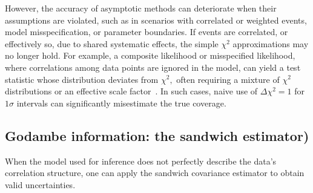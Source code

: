         However, the accuracy of asymptotic methods can deteriorate when their assumptions are violated, such as in scenarios with correlated or weighted events, model misspecification, or parameter boundaries.
        If events are correlated, or effectively so, due to shared systematic effects, the simple $\chi^2$ approximations may no longer hold.
        For example, a composite likelihood or misspecified likelihood, where correlations among data points are ignored in the model, can yield a test statistic whose distribution deviates from $\chi^2,$ often requiring a mixture of $\chi^2$ distributions or an effective scale factor~\cite{li_optimal_2024, jamil_pairwise_2024, tang_is_2025, Fowlie:2021ldv, Ansarifard:2025hec}.
        In such cases, naive use of $\Delta\chi^2=1$ for $1\sigma$ intervals can significantly misestimate the true coverage.

        \subsection{Godambe information: the sandwich estimator)}
            When the model used for inference does not perfectly describe the data's correlation structure, one can apply the sandwich covariance estimator to obtain valid uncertainties.

